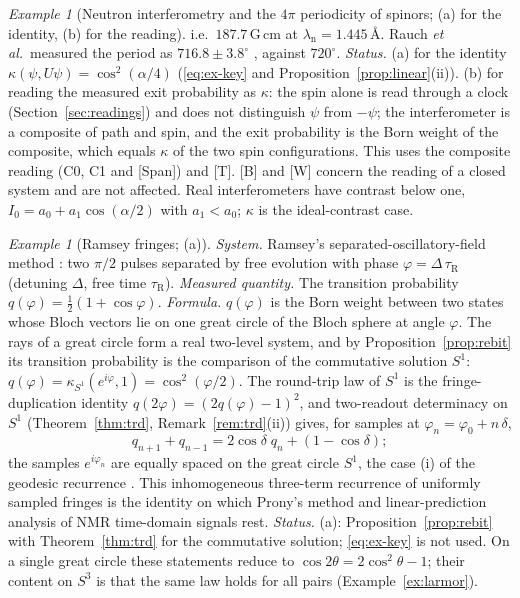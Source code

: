 \documentclass[aps,pra,onecolumn,superscriptaddress,nofootinbib,10pt]{revtex4-2}
\theoremstyle{definition}
\theoremstyle{remark}
\newtheorem{example}[theorem]{Example}
\begin{document}
\begin{example}[Neutron interferometry and the $4\pi$ periodicity of spinors; (a) for the identity, (b) for the reading]
i.e.\ $187.7$\,G\,cm at $\lambda_{\mathrm n}=1.445$\,\AA.  Rauch \emph{et al.}\ measured the period as
$716.8\pm3.8^\circ$ \cite{ex-Rauch78}, against $720^\circ$.
\emph{Status.}  (a) for the identity $\kappa(\psi,U\psi)=\cos^2(\alpha/4)$ (\eqref{eq:ex-key} and
Proposition~\ref{prop:linear}(ii)).  (b) for reading the measured exit probability as $\kappa$: the spin
alone is read through a clock (Section~\ref{sec:readings}) and does not distinguish $\psi$ from $-\psi$; the
interferometer is a composite of path and spin, and the exit probability is the Born weight of the
composite, which equals $\kappa$ of the two spin configurations.  This uses the composite reading
(C0, C1 and [Span]) and [T].  [B] and [W] concern the reading of a closed system and are
not affected.  Real interferometers have contrast below one, $I_0=a_0+a_1\cos(\alpha/2)$ with $a_1<a_0$; $\kappa$
is the ideal-contrast case.
\end{example}

\begin{example}[Ramsey fringes; (a)]\label{ex:ramsey}
\emph{System.}  Ramsey's separated-oscillatory-field method \cite{ex-Ramsey50}: two $\pi/2$ pulses separated
by free evolution with phase $\varphi=\Delta\,\tau_{\mathrm R}$ (detuning $\Delta$, free time $\tau_{\mathrm R}$).
\emph{Measured quantity.}  The transition probability $q(\varphi)=\tfrac12(1+\cos\varphi)$.
\emph{Formula.}  $q(\varphi)$ is the Born weight between two states whose Bloch vectors lie on one great circle
of the Bloch sphere at angle $\varphi$.  The rays of a great circle form a real two-level system, and by
Proposition~\ref{prop:rebit} its transition probability is the comparison of the commutative solution
$S^1$: $q(\varphi)=\kappa_{S^1}(e^{i\varphi},1)=\cos^2(\varphi/2)$.  The round-trip law of $S^1$ is the
fringe-duplication identity $q(2\varphi)=(2q(\varphi)-1)^2$, and two-readout determinacy on $S^1$
(Theorem~\ref{thm:trd}, Remark~\ref{rem:trd}(ii)) gives, for samples at $\varphi_n=\varphi_0+n\,\delta$,
\[
q_{n+1}+q_{n-1}=2\cos\delta\;q_n+(1-\cos\delta);
\]
the samples $e^{i\varphi_n}$ are equally spaced on the great circle $S^1$, the case (i) of the geodesic
recurrence \cite[Thm.~6.2(i)]{PaperI}.  This inhomogeneous three-term recurrence of uniformly sampled fringes is the identity
on which Prony's method \cite{ex-Prony1795} and linear-prediction analysis of NMR time-domain signals
\cite{ex-BdBBvO85} rest.
\emph{Status.}  (a): Proposition~\ref{prop:rebit} with Theorem~\ref{thm:trd} for the commutative solution;
\eqref{eq:ex-key} is not used.  On a single great circle these statements reduce to
$\cos2\theta=2\cos^2\theta-1$; their content on $S^3$ is that the same law holds for all pairs
(Example~\ref{ex:larmor}).
\end{example}
\end{document}

